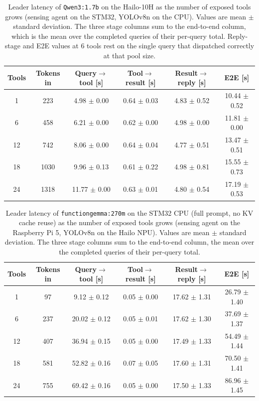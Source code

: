 \begin{table}[H]
\centering
\caption{Leader latency of \texttt{Qwen3:1.7b} on the Hailo-10H as the number of
exposed tools grows (sensing agent on the STM32, YOLOv8n on the CPU). Values are
mean $\pm$ standard deviation. The three stage columns sum to the end-to-end column,
which is the mean over the completed queries of their per-query total. Reply-stage
and E2E values at $6$ tools rest on the single query that dispatched correctly at
that pool size.}
\label{tab:lat_qwen}
\small
\begin{tabular}{cccccc}
\toprule
\textbf{Tools} & \textbf{Tokens in} & \textbf{Query$\rightarrow$tool [s]} & \textbf{Tool$\rightarrow$result [s]} & \textbf{Result$\rightarrow$reply [s]} & \textbf{E2E [s]} \\
\midrule
1 & 223 & 4.98 $\pm$ 0.00 & 0.64 $\pm$ 0.03 & 4.83 $\pm$ 0.52 & 10.44 $\pm$ 0.52 \\
6 & 458 & 6.21 $\pm$ 0.00 & 0.62 $\pm$ 0.00 & 4.98 $\pm$ 0.00 & 11.81 $\pm$ 0.00 \\
12 & 742 & 8.06 $\pm$ 0.00 & 0.64 $\pm$ 0.04 & 4.77 $\pm$ 0.51 & 13.47 $\pm$ 0.51 \\
18 & 1030 & 9.96 $\pm$ 0.13 & 0.61 $\pm$ 0.22 & 4.98 $\pm$ 0.81 & 15.55 $\pm$ 0.73 \\
24 & 1318 & 11.77 $\pm$ 0.00 & 0.63 $\pm$ 0.01 & 4.80 $\pm$ 0.54 & 17.19 $\pm$ 0.53 \\
\bottomrule
\end{tabular}
\end{table}

\begin{table}[H]
\centering
\caption{Leader latency of \texttt{functiongemma:270m} on the STM32 CPU (full
prompt, no KV cache reuse) as the number of exposed tools grows (sensing agent on
the Raspberry Pi 5, YOLOv8n on the Hailo NPU). Values are mean $\pm$ standard
deviation. The three stage columns sum to the end-to-end column, the mean over the
completed queries of their per-query total.}
\label{tab:lat_fgemma}
\small
\begin{tabular}{cccccc}
\toprule
\textbf{Tools} & \textbf{Tokens in} & \textbf{Query$\rightarrow$tool [s]} & \textbf{Tool$\rightarrow$result [s]} & \textbf{Result$\rightarrow$reply [s]} & \textbf{E2E [s]} \\
\midrule
1 & 97 & 9.12 $\pm$ 0.12 & 0.05 $\pm$ 0.00 & 17.62 $\pm$ 1.31 & 26.79 $\pm$ 1.40 \\
6 & 237 & 20.02 $\pm$ 0.12 & 0.05 $\pm$ 0.01 & 17.62 $\pm$ 1.30 & 37.69 $\pm$ 1.37 \\
12 & 407 & 36.94 $\pm$ 0.15 & 0.05 $\pm$ 0.00 & 17.49 $\pm$ 1.33 & 54.49 $\pm$ 1.44 \\
18 & 581 & 52.82 $\pm$ 0.16 & 0.07 $\pm$ 0.05 & 17.60 $\pm$ 1.31 & 70.50 $\pm$ 1.41 \\
24 & 755 & 69.42 $\pm$ 0.16 & 0.05 $\pm$ 0.00 & 17.50 $\pm$ 1.33 & 86.96 $\pm$ 1.45 \\
\bottomrule
\end{tabular}
\end{table}

